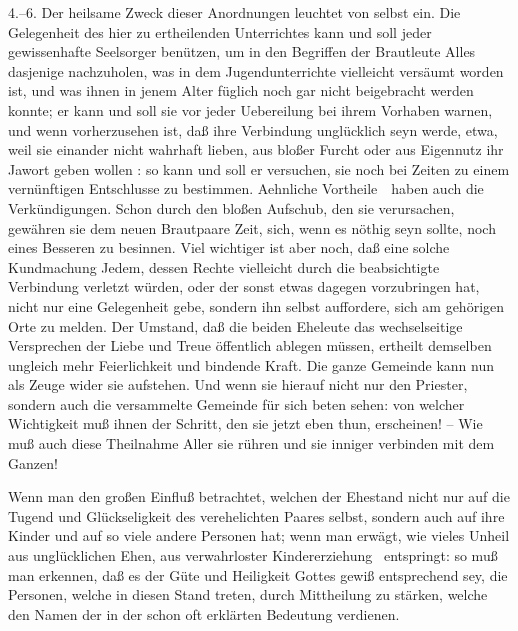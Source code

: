 \begin{aufza}
\item[4.--6.] Der heilsame Zweck dieser Anordnungen leuchtet von selbst ein. Die Gelegenheit des hier zu ertheilenden Unterrichtes kann und soll jeder gewissenhafte Seelsorger benützen, um in den Begriffen der Brautleute Alles dasjenige nachzuholen, was in dem Jugendunterrichte vielleicht versäumt worden ist, und was ihnen in jenem Alter füglich noch gar nicht beigebracht werden konnte; er kann und soll sie vor jeder Uebereilung bei ihrem Vorhaben warnen, und wenn vorherzusehen ist, daß ihre Verbindung unglücklich seyn werde, etwa, weil sie einander nicht wahrhaft lieben, aus bloßer Furcht oder aus Eigennutz ihr Jawort geben wollen \udgl : so kann und soll er versuchen, sie noch bei Zeiten zu einem vernünftigen Entschlusse zu bestimmen. Aehnliche Vortheile~\ haben auch die Verkündigungen. Schon durch den bloßen Aufschub, den sie verursachen, gewähren sie dem neuen Brautpaare Zeit, sich, wenn es nöthig seyn sollte, noch eines Besseren zu besinnen. Viel wichtiger ist aber noch, daß eine solche Kundmachung Jedem, dessen Rechte vielleicht durch die beabsichtigte Verbindung verletzt würden, oder der sonst etwas dagegen vorzubringen hat, nicht nur eine Gelegenheit gebe, sondern ihn selbst auffordere, sich am gehörigen Orte zu melden. Der Umstand, daß die beiden Eheleute das wechselseitige Versprechen der Liebe und Treue öffentlich ablegen müssen, ertheilt demselben ungleich mehr Feierlichkeit und bindende Kraft. Die ganze Gemeinde kann nun als Zeuge wider sie aufstehen. Und wenn sie hierauf nicht nur den Priester, sondern auch die versammelte Gemeinde für sich beten sehen: von welcher Wichtigkeit muß ihnen der Schritt, den sie jetzt eben thun, erscheinen! -- Wie muß auch diese Theilnahme Aller sie rühren und sie inniger verbinden mit dem Ganzen!
\item Wenn man den großen Einfluß betrachtet, welchen der Ehestand nicht nur auf die Tugend und Glückseligkeit des verehelichten Paares selbst, sondern auch auf ihre Kinder und auf so viele andere Personen hat; wenn man erwägt, wie vieles Unheil aus unglücklichen Ehen, aus verwahrloster Kindererziehung \usw\ entspringt: so muß man erkennen, daß es der Güte und Heiligkeit Gottes gewiß entsprechend sey, die Personen, welche in diesen Stand treten, durch Mittheilung  zu stärken, welche den Namen der  in der schon oft erklärten Bedeutung verdienen.
\end{aufza}


